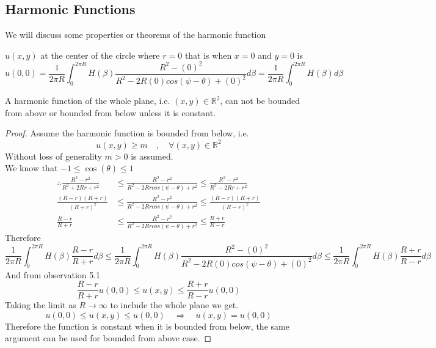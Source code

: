 \subsection{Harmonic Functions}
We will discuss some properties or theorems of the harmonic function
\begin{observation}
    $u(x,y)$ at the center of the circle where $r=0$ that is when $x=0$ and $y=0$ is
    \[
        u(0,0) = \frac{1}{2\pi R}\int_{0}^{2\pi R} H(\beta)\frac{R^2-(0)^2}{R^2-2R(0)cos(\psi  -\theta)+(0)^2}d\beta =\frac{1}{2\pi R}\int_{0}^{2\pi R} H(\beta)d\beta     
    \]
\end{observation}    
\begin{theorem}
    A harmonic function of the whole plane, i.e. $(x,y) \in \mathbb{R}^2$, can not be bounded from above or bounded from below unless it is constant.    
\end{theorem}
\begin{proof}[\textcolor{theme}{Proof}]
    Assume the harmonic function is bounded from below, i.e.    
    \[
        u(x,y) \geq m \quad,\quad \forall (x,y) \in \mathbb{R}^2     
    \]
    Without loss of generality $m > 0$ is assumed.
    \\
    We know that $ -1 \leq \cos(\theta) \leq 1$
    \begin{align*}
        \therefore
        \frac{R^2-r^2}{R^2+2Rr+r^2} &\leq \frac{R^2-r^2}{R^2-2Rrcos(\psi  -\theta)+r^2} \leq \frac{R^2-r^2}{R^2-2Rr+r^2}
        \\
        \frac{(R-r)(R+r)}{{(R+r)}^2} &\leq \frac{R^2-r^2}{R^2-2Rrcos(\psi  -\theta)+r^2} \leq \frac{(R-r)(R+r)}{{(R-r)}^2}
        \\
        \frac{R-r}{R+r} &\leq \frac{R^2-r^2}{R^2-2Rrcos(\psi  -\theta)+r^2} \leq \frac{R+r}{R-r}
    \end{align*}
    Therefore
    \[
        \frac{1}{2\pi R}\int_{0}^{2\pi R} H(\beta)\frac{R-r}{R+r} d\beta \leq \frac{1}{2\pi R}\int_{0}^{2\pi R} H(\beta)\frac{R^2-(0)^2}{R^2-2R(0)cos(\psi  -\theta)+(0)^2}d\beta \leq \frac{1}{2\pi R}\int_{0}^{2\pi R} H(\beta)\frac{R+r}{R-r} d\beta    
    \]
    And from observation 5.1 
    \[
        \frac{R-r}{R+r} u(0,0) \leq u(x,y) \leq \frac{R+r}{R-r} u(0,0)    
    \]
    Taking the limit as $R \to \infty$ to include the whole plane we get.
    \[
        u(0,0) \leq u(x,y) \leq u(0,0) \quad \Rightarrow \quad u(x,y) = u(0,0)    
    \]
    Therefore the function is constant when it is bounded from below, the same argument can be used for bounded from above case.
\end{proof}

